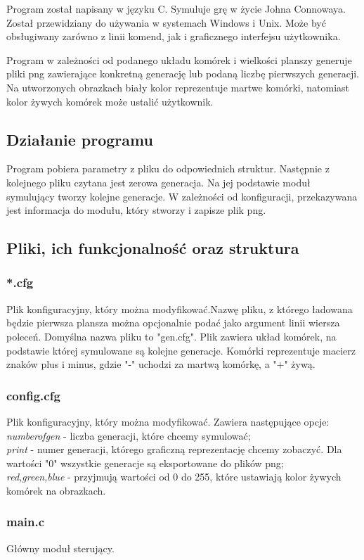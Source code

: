 \documentclass{article}
\begin{document}
Program został napisany w języku C. Symuluje grę w życie Johna Connowaya.  Został przewidziany do używania w systemach Windows i Unix. Może być obsługiwany zarówno z linii komend, jak i graficznego interfejsu użytkownika.

Program w zależności od podanego układu komórek i wielkości planszy generuje pliki png zawierające konkretną generację lub podaną liczbę pierwszych generacji. Na utworzonych obrazkach biały kolor reprezentuje martwe komórki, natomiast kolor żywych komórek może ustalić użytkownik.
\subsection*{Działanie programu}
Program pobiera parametry z pliku do odpowiednich struktur. Następnie z kolejnego pliku czytana jest zerowa generacja. Na jej podstawie moduł symulujący tworzy kolejne generacje. W zależności od konfiguracji, przekazywana jest informacja do modułu, który stworzy i zapisze plik
png.
\subsection*{Pliki, ich funkcjonalność oraz struktura}
\subsubsection*{*.cfg}
Plik konfiguracyjny, który można modyfikować.Nazwę pliku, z którego ładowana będzie pierwsza plansza można opcjonalnie podać jako argument linii wiersza poleceń. Domyślna nazwa pliku to "gen.cfg".
Plik zawiera układ komórek, na podstawie której symulowane są kolejne generacje. Komórki reprezentuje macierz znaków plus i minus, gdzie "-" uchodzi za martwą komórkę, a "+" żywą.
\subsubsection*{config.cfg}
Plik konfiguracyjny, który można modyfikować. Zawiera następujące opcje:\\
\emph{numberofgen }- liczba generacji, które chcemy symulować;\\
\emph{print} - numer generacji, którego graficzną reprezentację chcemy zobaczyć. Dla wartości "0" wszystkie generacje są eksportowane do plików png;\\
\emph{red,green,blue} - przyjmują wartości  od 0 do 255, które ustawiają kolor żywych komórek na obrazkach.
\subsubsection*{main.c}
Główny moduł sterujący. 
\end{document}
